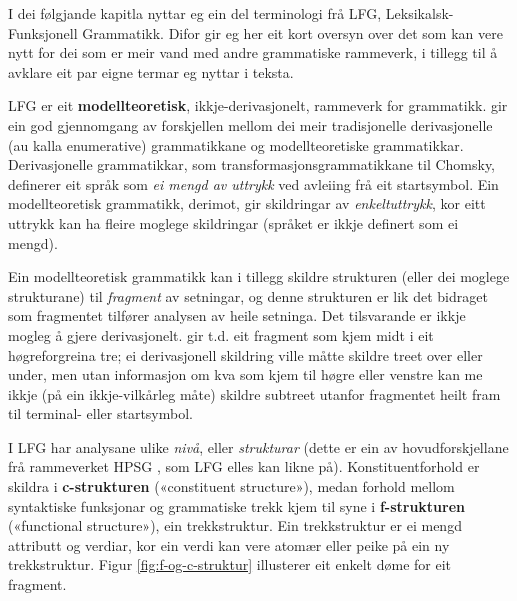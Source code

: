 \documentclass[11pt,a4paper,oneside,draft]{report}
\begin{document}
 \label{SEC:omgrepsavklaring}

 I dei følgjande kapitla nyttar eg ein del terminologi frå LFG,
 Leksikalsk-Funksjonell Grammatikk. Difor gir eg her eit kort oversyn
 over det som kan vere nytt for dei som er meir vand med andre
 grammatiske rammeverk, i tillegg til å avklare eit par eigne termar
 eg nyttar i teksta.

 LFG er eit \textbf{modellteoretisk}, ikkje-derivasjonelt, rammeverk for
 grammatikk.  \citet{pullum2001dbm} gir ein god gjennomgang av
 forskjellen mellom dei meir tradisjonelle derivasjonelle (au kalla
 enumerative) grammatikkane og modellteoretiske
 grammatikkar. Derivasjonelle grammatikkar, som
 transformasjonsgrammatikkane til Chomsky, definerer eit språk som \emph{ei  mengd av uttrykk} ved avleiing frå eit startsymbol. Ein
 modellteoretisk grammatikk, derimot, gir skildringar av
 \emph{enkeltuttrykk}, kor eitt uttrykk kan ha fleire moglege skildringar
 (språket er ikkje definert som ei mengd).

 Ein modellteoretisk grammatikk kan i tillegg skildre strukturen
 (eller dei moglege strukturane) til \emph{fragment} av setningar, og denne
 strukturen er lik det bidraget som fragmentet tilfører analysen av
 heile setninga. Det tilsvarande er ikkje mogleg å gjere
 derivasjonelt. \citet[s.~32--33]{pullum2001dbm} gir t.d. eit fragment
 som kjem midt i eit høgreforgreina tre; ei derivasjonell skildring
 ville måtte skildre treet over eller under, men utan informasjon om
 kva som kjem til høgre eller venstre kan me ikkje (på ein
 ikkje-vilkårleg måte) skildre subtreet utanfor fragmentet heilt fram
 til terminal- eller startsymbol.

 I LFG har analysane ulike \emph{nivå}, eller \emph{strukturar} (dette er ein av
 hovudforskjellane frå rammeverket HPSG \citep{swb-hpsg}, som LFG
 elles kan likne på). Konstituentforhold er skildra i \textbf{c-strukturen}
 («constituent structure»), medan forhold mellom syntaktiske
 funksjonar og grammatiske trekk kjem til syne i \textbf{f-strukturen}
 («functional structure»), ein trekkstruktur. Ein trekkstruktur er ei
 mengd attributt og verdiar, kor ein verdi kan vere atomær eller peike
 på ein ny trekkstruktur.  Figur \ref{fig:f-og-c-struktur} illusterer
 eit enkelt døme for eit fragment.
\end{document}
